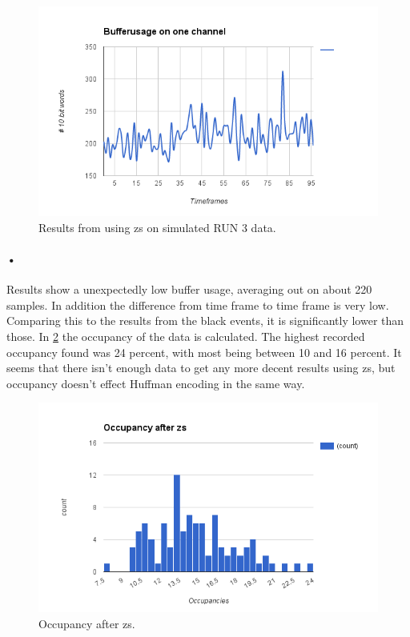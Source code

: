 \documentclass[a4paper, 12pt, openright, twoside]{report}
\begin{document}
\begin{figure}[h!]
	\centering
		\includegraphics[width=1.0\textwidth]{images/bufferuse-one-channel-fake-pileup.png}
		\caption{Results from using \gls{zs} on simulated RUN 3 data.}
		\label{fig:synthetic-zs}
\end{figure}

\paragraph{•}
Results show a unexpectedly low buffer usage, averaging out on about 220 samples.
In addition the difference from time frame to time frame is very low.
Comparing this to the results from the black events, it is significantly lower than those.
In \ref{fig:occ-synt-zs} the occupancy of the data is calculated.
The highest recorded occupancy found was 24 percent, with most being between 10 and 16 percent.
It seems that there isn't enough data to get any more decent results using \gls{zs}, but occupancy doesn't effect Huffman encoding in the same way.

\begin{figure}[h!]
	\centering
		\includegraphics[width=1.0\textwidth]{images/occ-after-zs.png}
		\caption{Occupancy after \gls{zs}.}
		\label{fig:occ-synt-zs}
\end{figure}
\end{document}
